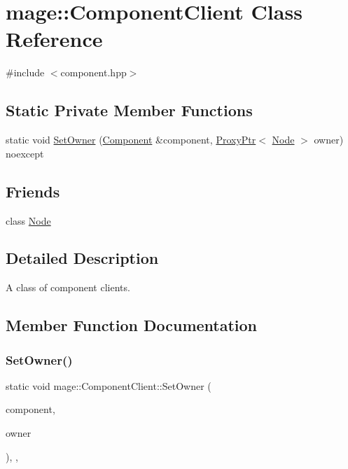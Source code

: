 \hypertarget{classmage_1_1_component_client}{}\section{mage\+:\+:Component\+Client Class Reference}
\label{classmage_1_1_component_client}


{\ttfamily \#include $<$component.\+hpp$>$}

\subsection*{Static Private Member Functions}
\begin{DoxyCompactItemize}
\item 
static void \hyperlink{classmage_1_1_component_client_a268413a2179e0f29ac78b0c5f26ecaca}{Set\+Owner} (\hyperlink{classmage_1_1_component}{Component} \&component, \hyperlink{classmage_1_1_proxy_ptr}{Proxy\+Ptr}$<$ \hyperlink{classmage_1_1_node}{Node} $>$ owner) noexcept
\end{DoxyCompactItemize}
\subsection*{Friends}
\begin{DoxyCompactItemize}
\item 
class \hyperlink{classmage_1_1_component_client_a6db9d28bd448a131448276ee03de1e6d}{Node}
\end{DoxyCompactItemize}


\subsection{Detailed Description}
A class of component clients. 

\subsection{Member Function Documentation}
\hypertarget{classmage_1_1_component_client_a268413a2179e0f29ac78b0c5f26ecaca}{}\label{classmage_1_1_component_client_a268413a2179e0f29ac78b0c5f26ecaca} 
\subsubsection{\texorpdfstring{Set\+Owner()}{SetOwner()}}
{\footnotesize\ttfamily static void mage\+::\+Component\+Client\+::\+Set\+Owner (\begin{DoxyParamCaption}\item[{\hyperlink{classmage_1_1_component}{Component} \&}]{component,  }\item[{\hyperlink{classmage_1_1_proxy_ptr}{Proxy\+Ptr}$<$ \hyperlink{classmage_1_1_node}{Node} $>$}]{owner }\end{DoxyParamCaption})\hspace{0.3cm}{\ttfamily [static]}, {\ttfamily [private]}, {\ttfamily [noexcept]}}

